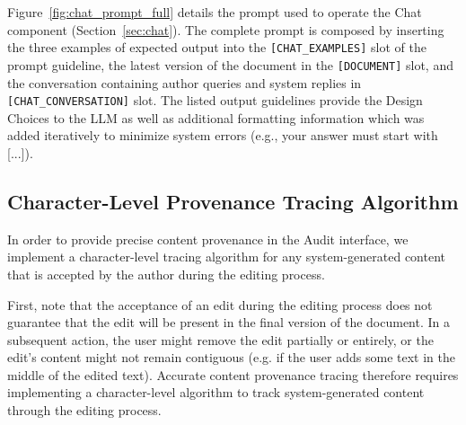 \documentclass[manuscript]{acmart}
\begin{document}
\begin{figure*}
    \centering
    \begin{minipage}[t]{0.49\textwidth}
    \end{minipage}\hfill
    \begin{minipage}[t]{.49\textwidth}
    \end{minipage}\hfill
    \caption{The prompt used to operate the Chat component. The complete prompt is formed by inserting the three examples in () into the () guidelines at the \texttt{[CHAT\_EXAMPLES]} location, the latest version of the document is inserted into the \texttt{[DOCUMENT]} location, and the conversation containing author queries in \texttt{[CHAT\_CONVERSATION]}.}
    \label{fig:chat_prompt_full}
\end{figure*}

Figure~\ref{fig:chat_prompt_full} details the prompt used to operate the Chat component (Section~\ref{sec:chat}). The complete prompt is composed by inserting the three examples of expected output into the \texttt{[CHAT\_EXAMPLES]} slot of the prompt guideline, the latest version of the document in the \texttt{[DOCUMENT]} slot, and the conversation containing author queries and system replies in \texttt{[CHAT\_CONVERSATION]} slot. The listed output guidelines provide the Design Choices to the LLM as well as additional formatting information which was added iteratively to minimize system errors (e.g., your answer must start with [...]).

\subsection{Character-Level Provenance Tracing Algorithm} \label{app:tracing_algorithm}

In order to provide precise content provenance in the Audit interface, we implement a character-level tracing algorithm for any system-generated content that is accepted by the author during the editing process.

First, note that the acceptance of an edit during the editing process does not guarantee that the edit will be present in the final version of the document. In a subsequent action, the user might remove the edit partially or entirely, or the edit's content might not remain contiguous (e.g. if the user adds some text in the middle of the edited text). Accurate content provenance tracing therefore requires implementing a character-level algorithm to track system-generated content through the editing process.
\end{document}
